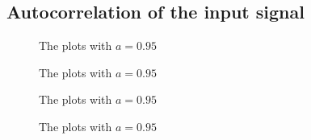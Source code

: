 \documentclass[final]{scrreprt} %
\begin{document}
\subsection{Autocorrelation of the input signal}

\begin{figure}[H]
	\centering
    	\setlength\figureheight{6cm}
    	\setlength\figurewidth{10cm}
    	    	
    	\caption{The plots with $a=0.95$}
    	\label{fig:a0.95-plots}
\end{figure}
\begin{figure}[H]
	\centering
    	\setlength\figureheight{6cm}
    	\setlength\figurewidth{10cm}
    	    	
    	\caption{The plots with $a=0.95$}
    	\label{fig:a0.95-plots}
\end{figure}
\begin{figure}[H]
	\centering
    	\setlength\figureheight{6cm}
    	\setlength\figurewidth{10cm}
    	    	
    	\caption{The plots with $a=0.95$}
    	\label{fig:a0.95-plots}
\end{figure}
\begin{figure}[H]
	\centering
    	\setlength\figureheight{6cm}
    	\setlength\figurewidth{10cm}
    	    	
    	\caption{The plots with $a=0.95$}
    	\label{fig:a0.95-plots}
\end{figure}
\end{document}
